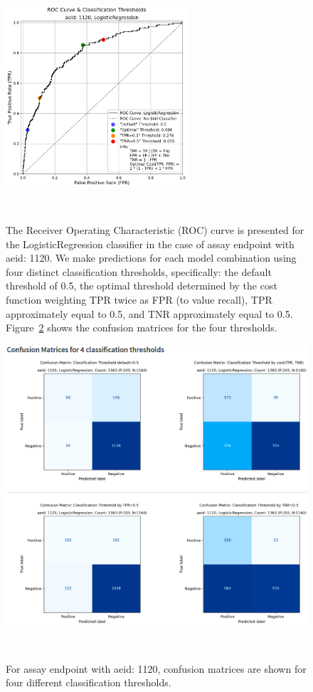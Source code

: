 \begin{figure}[h]
  \centering
  \includegraphics[width=0.6\textwidth]{figures/roc1120.png}
  \caption{The Receiver Operating Characteristic (ROC) curve is presented for the LogisticRegression classifier in the case of assay endpoint with aeid: 1120. We make predictions for each model combination using four distinct classification thresholds, specifically: the default threshold of 0.5, the optimal threshold determined by the cost function weighting TPR twice as FPR (to value recall), TPR approximately equal to 0.5, and TNR approximately equal to 0.5. Figure~\ref{fig:cm1120} shows the confusion matrices for the four thresholds.}
~\label{fig:roc1120}
\end{figure}

\begin{figure}[h]
  \centering
  \includegraphics[width=1.0\textwidth]{figures/cm1120.png}
  \caption{For assay endpoint with aeid: 1120, confusion matrices are shown for four different classification thresholds.}
~\label{fig:cm1120}
\end{figure}

